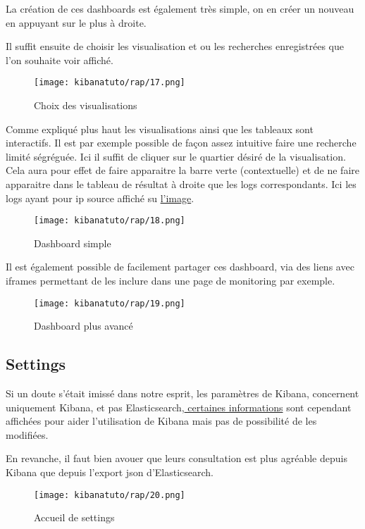 La création de ces dashboards est également très simple, on en créer un nouveau en 
appuyant sur le plus à droite.

Il suffit ensuite de choisir les visualisation et ou les recherches enregistrées 
que l'on souhaite voir affiché.

\begin{figure}[H]
\center
\texttt{[image: kibanatuto/rap/17.png]}
\label{fig:kibanatuto10}
\caption{Choix des visualisations}
\end{figure}

Comme expliqué plus haut les visualisations ainsi que les tableaux sont interactifs.
Il est par exemple possible de façon assez intuitive faire une recherche limité ségréguée.
Ici il suffit de cliquer sur le quartier désiré de la visualisation. Cela aura pour 
effet de faire apparaitre la barre verte (contextuelle) et de ne faire apparaitre 
dans le tableau de résultat à droite que les logs correspondants. Ici les logs ayant
pour ip source affiché su \hyperref[fig:kibanatuto11]{l'image}.

\begin{figure}[H]
\center
\texttt{[image: kibanatuto/rap/18.png]}
\label{fig:kibanatuto11}
\caption{Dashboard simple}
\end{figure}

Il est également possible de facilement partager ces dashboard, via des liens avec 
iframes permettant de les inclure dans une page de monitoring par exemple.

\begin{figure}[H]
\center
\texttt{[image: kibanatuto/rap/19.png]}
\label{fig:kibanatuto12}
\caption{Dashboard plus avancé}
\end{figure}

\subsection{Settings}
Si un doute s'était imissé dans notre esprit, les paramètres de Kibana, concernent
uniquement Kibana, et pas Elasticsearch,\hyperref[fig:kibanatuto14]{ certaines informations} 
sont cependant affichées pour aider l'utilisation de Kibana mais pas de possibilité 
de les modifiées.

En revanche, il faut bien avouer que leurs consultation est plus agréable depuis 
Kibana que depuis l'export json d'Elasticsearch.

\begin{figure}[H]
\center
\texttt{[image: kibanatuto/rap/20.png]}
\label{fig:kibanatuto13}
\caption{Accueil de settings}
\end{figure}


